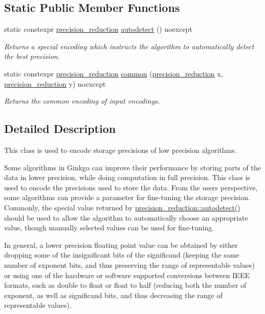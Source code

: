 \subsection*{Static Public Member Functions}
\begin{DoxyCompactItemize}
\item 
static constexpr \hyperlink{classgko_1_1precision__reduction}{precision\+\_\+reduction} \hyperlink{classgko_1_1precision__reduction_ac4109c61fadb24db7a1888c51ac483e9}{autodetect} () noexcept
\begin{DoxyCompactList}\small\item\em Returns a special encoding which instructs the algorithm to automatically detect the best precision. \end{DoxyCompactList}\item 
static constexpr \hyperlink{classgko_1_1precision__reduction}{precision\+\_\+reduction} \hyperlink{classgko_1_1precision__reduction_aa0ac7ac5a2807f3a0e9bd245273be388}{common} (\hyperlink{classgko_1_1precision__reduction}{precision\+\_\+reduction} x, \hyperlink{classgko_1_1precision__reduction}{precision\+\_\+reduction} y) noexcept
\begin{DoxyCompactList}\small\item\em Returns the common encoding of input encodings. \end{DoxyCompactList}\end{DoxyCompactItemize}


\subsection{Detailed Description}
This class is used to encode storage precisions of low precision algorithms. 

Some algorithms in Ginkgo can improve their performance by storing parts of the data in lower precision, while doing computation in full precision. This class is used to encode the precisions used to store the data. From the user\textquotesingle{}s perspective, some algorithms can provide a parameter for fine-\/tuning the storage precision. Commonly, the special value returned by \hyperlink{classgko_1_1precision__reduction_ac4109c61fadb24db7a1888c51ac483e9}{precision\+\_\+reduction\+::autodetect()} should be used to allow the algorithm to automatically choose an appropriate value, though manually selected values can be used for fine-\/tuning.

In general, a lower precision floating point value can be obtained by either dropping some of the insignificant bits of the significand (keeping the same number of exponent bits, and thus preserving the range of representable values) or using one of the hardware or software supported conversions between I\+E\+EE formats, such as double to float or float to half (reducing both the number of exponent, as well as significand bits, and thus decreasing the range of representable values).


